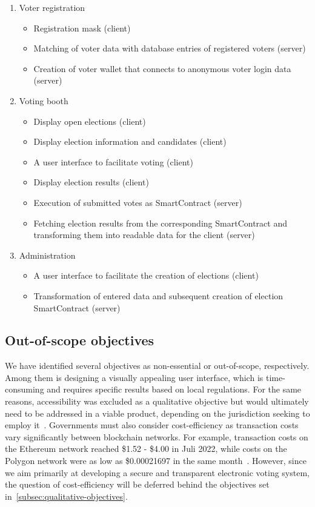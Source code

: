 \begin{enumerate}
    \item Voter registration
    \begin{itemize}
        \item Registration mask (client)
        \item Matching of voter data with database entries of registered voters (server)
        \item Creation of voter wallet that connects to anonymous voter login data (server)
    \end{itemize}
    \item Voting booth
    \begin{itemize}
        \item Display open elections (client)
        \item Display election information and candidates (client)
        \item A user interface to facilitate voting (client)
        \item Display election results (client)
        \item Execution of submitted votes as \gls{SmartContract} (server)
        \item Fetching election results from the corresponding \gls{SmartContract} and transforming them into readable data for the client (server)
    \end{itemize}
    \item Administration
    \begin{itemize}
        \item A user interface to facilitate the creation of elections (client)
        \item Transformation of entered data and subsequent creation of election \gls{SmartContract} (server)
    \end{itemize}
\end{enumerate}

\subsection{Out-of-scope objectives}\label{subsec:out-of-scope-objectives}

We have identified several objectives as non-essential or out-of-scope, respectively.
Among them is designing a visually appealing user interface, which is time-consuming and requires specific results based on local regulations.
For the same reasons, accessibility was excluded as a qualitative objective but would ultimately need to be addressed in a viable product, depending on the jurisdiction seeking to employ it~\autocites{laskowski_promoting_2022}[sections 2.2, 2.7]{lowry_desirable_2009}.
Governments must also consider cost-efficiency as transaction costs vary significantly between blockchain networks.
For example, transaction costs on the Ethereum network reached \$1.52 - \$4.00 in Juli 2022, while costs on the Polygon network were as low as \$0.00021697 in the same month~\autocite{shrivastava_ethereum_2022}.
However, since we aim primarily at developing a secure and transparent electronic voting system, the question of cost-efficiency will be deferred behind the objectives set in~\cref{subsec:qualitative-objectives}.

